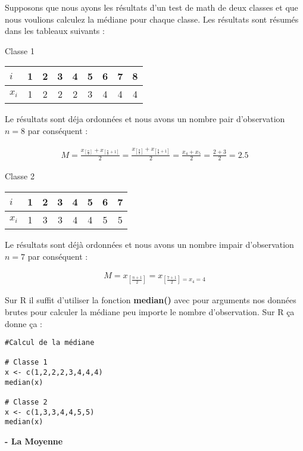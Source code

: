 \documentclass{report}
\begin{document}
Supposons que nous ayons les résultats d'un test de math de deux classes et que nous voulions calculez la médiane pour chaque classe. Les résultats sont résumés dans les tableaux suivants :

Classe 1

\begin{center}
\begin{tabular}{l c c c c c c c c} 
\hline
$i$&1&2&3&4&5&6&7&8 \\ 
\hline
$x_i$&1&2&2&2&3&4&4&4 \\
\hline
\end{tabular}
\end{center}
\quad

Le résultats sont déja ordonnées et nous avons un nombre pair d'observation $n= 8$ par conséquent :

\begin{align*}
M=\frac{x_{[\frac{n}{2}]}+x_{[\frac{n}{2}+1]}}{2} = \frac{x_{[\frac{8}{2}]}+x_{[\frac{8}{2}+1]}}{2} = \frac{x_4+x_5}{2} = \frac{2+3}{2}=2.5 
\end{align*}

Classe 2

\begin{center}
\begin{tabular}{l c c c c c c c} 
\hline
$i$&1&2&3&4&5&6&7 \\ 
\hline
$x_i$&1&3&3&4&4&5&5 \\
\hline
\end{tabular}
\end{center}
\quad

Le résultats sont déjà ordonnées et nous avons un nombre impair d'observation $n= 7$ par conséquent :

\begin{align*}
  M=x_{[\frac{n+1}{2}]} = x_{[\frac{7+1}{2}] = x_4 = 4}  
\end{align*}

Sur R il suffit d'utiliser la fonction \textbf{median()} avec pour arguments nos données brutes pour calculer la médiane peu importe le nombre d'observation. Sur R ça donne ça :

\begin{verbatim}
#Calcul de la médiane

# Classe 1 
x <- c(1,2,2,2,3,4,4,4)
median(x)

# Classe 2
x <- c(1,3,3,4,4,5,5)
median(x)
\end{verbatim}

\textbf{- La Moyenne}
\end{document}
